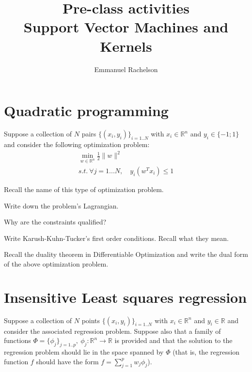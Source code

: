 \documentclass{article}
\author{Emmanuel Rachelson}
\title{Pre-class activities\\Support Vector Machines and Kernels}
\date{}
\begin{document}
\maketitle

\section{Quadratic programming}


Suppose a collection of $N$ pairs $\{(x_i,y_i)\}_{i=1..N}$ with $x_i\in \mathbb{R}^n$ and $y_i \in \{-1;1\}$ and consider the following optimization problem:
\begin{gather*}
\min_{w\in\mathbb{R}^n} \frac{1}{2}\|w\|^2\\
s.t. \ \forall j=1...N, \quad y_i \left( w^T x_i \right) \leq 1
\end{gather*}

\noindent {} Recall the name of this type of optimization problem.

\noindent {} Write down the problem's Lagrangian.

\noindent {} Why are the constraints qualified?

\noindent {} Write Karush-Kuhn-Tucker's first order conditions. Recall what they mean.

\noindent {} Recall the duality theorem in Differentiable Optimization and write the dual form of the above optimization problem.

\section{Insensitive Least squares regression}

Suppose a collection of $N$ points $\{(x_i,y_i)\}_{i=1..N}$ with $x_i\in \mathbb{R}^n$ and $y_i \in \mathbb{R}$ and consider the associated regression problem. Suppose also that a family of functions $\Phi=\{\phi_j\}_{j=1..p}, \ \phi_j:\mathbb{R}^n \rightarrow \mathbb{R}$ is provided and that the solution to the regression problem should lie in the space spanned by $\Phi$ (that is, the regression function $f$ should have the form $f=\sum_{j=1}^p w_j \phi_j$).
\end{document}
